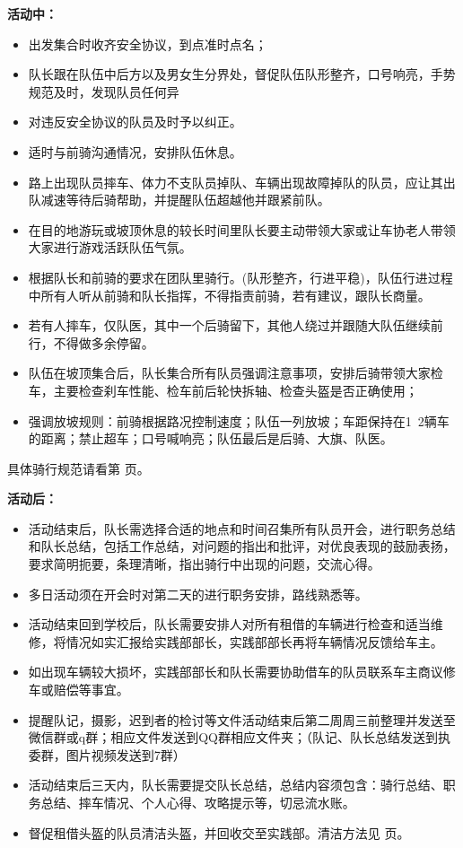 \documentclass{ctexbook}
\begin{document}
\textbf{活动中：}

\begin{itemize}
\item 出发集合时收齐安全协议，到点准时点名；
\item 队长跟在队伍中后方以及男女生分界处，督促队伍队形整齐，口号响亮，手势规范及时，发现队员任何异

\item 对违反安全协议的队员及时予以纠正。

\item 适时与前骑沟通情况，安排队伍休息。

\item 路上出现队员摔车、体力不支队员掉队、车辆出现故障掉队的队员，应让其出队减速等待后骑帮助，并提醒队伍超越他并跟紧前队。

\item 在目的地游玩或坡顶休息的较长时间里队长要主动带领大家或让车协老人带领大家进行游戏活跃队伍气氛。

\item 根据队长和前骑的要求在团队里骑行。(队形整齐，行进平稳)，队伍行进过程中所有人听从前骑和队长指挥，不得指责前骑，若有建议，跟队长商量。

\item 若有人摔车，仅队医，其中一个后骑留下，其他人绕过并跟随大队伍继续前行，不得做多余停留。
\item 队伍在坡顶集合后，队长集合所有队员强调注意事项，安排后骑带领大家检车，主要检查刹车性能、检车前后轮快拆轴、检查头盔是否正确使用；

\item 强调放坡规则：前骑根据路况控制速度；队伍一列放坡；车距保持在1~2辆车的距离；禁止超车；口号喊响亮；队伍最后是后骑、大旗、队医。
\end{itemize}

具体骑行规范请看第 \pageref{sec:基本准则} 页。

\textbf{活动后：}

\begin{itemize}

\item 活动结束后，队长需选择合适的地点和时间召集所有队员开会，进行职务总结和队长总结，包括工作总结，对问题的指出和批评，对优良表现的鼓励表扬，要求简明扼要，条理清晰，指出骑行中出现的问题，交流心得。
\item 多日活动须在开会时对第二天的进行职务安排，路线熟悉等。
\item 活动结束回到学校后，队长需要安排人对所有租借的车辆进行检查和适当维修，将情况如实汇报给实践部部长，实践部部长再将车辆情况反馈给车主。
\item 如出现车辆较大损坏，实践部部长和队长需要协助借车的队员联系车主商议修车或赔偿等事宜。
\item 提醒队记，摄影，迟到者的检讨等文件活动结束后第二周周三前整理并发送至微信群或q群；相应文件发送到QQ群相应文件夹；（队记、队长总结发送到执委群，图片视频发送到7群）
\item 活动结束后三天内，队长需要提交队长总结，总结内容须包含：骑行总结、职务总结、摔车情况、个人心得、攻略提示等，切忌流水账。
\item 督促租借头盔的队员清洁头盔，并回收交至实践部。清洁方法见\pageref{sec:头盔清洁} 页。
\end{itemize}
\end{document}
